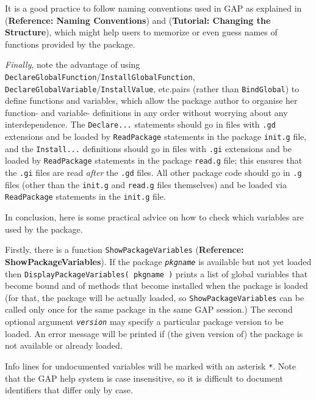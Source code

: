 \documentclass[a4paper,11pt]{report}
\begin{document}
{{ It is a good practice to follow naming conventions used in \textsf{GAP} as explained in  (\textbf{Reference: Naming Conventions}) and  (\textbf{Tutorial: Changing the Structure}), which might help users to memorize or even guess names of functions provided
by the package. 

 \emph{Finally}, note the advantage of using \texttt{DeclareGlobalFunction}/\texttt{InstallGlobalFunction}, \texttt{DeclareGlobalVariable}/\texttt{InstallValue}, etc.{\nobreakspace}pairs (rather than \texttt{BindGlobal}) to define functions and variables, which allow the package author to
organise her function- and variable- definitions in any order without worrying
about any interdependence. The \texttt{Declare...} statements should go in files with \texttt{.gd} extensions and be loaded by \texttt{ReadPackage} statements in the package \texttt{init.g} file, and the \texttt{Install...} definitions should go in files with \texttt{.gi} extensions and be loaded by \texttt{ReadPackage} statements in the package \texttt{read.g} file; this ensures that the \texttt{.gi} files are read \emph{after} the \texttt{.gd} files. All other package code should go in \texttt{.g} files (other than the \texttt{init.g} and \texttt{read.g} files themselves) and be loaded via \texttt{ReadPackage} statements in the \texttt{init.g} file. 

  In conclusion, here is some practical advice on how to check which variables
are used by the package. 

 Firstly, there is a function \texttt{ShowPackageVariables} (\textbf{Reference: ShowPackageVariables}). If the package \mbox{\texttt{\mdseries\slshape pkgname}} is available but not yet loaded then \texttt{DisplayPackageVariables( pkgname )} prints a list of global variables that become bound and of methods that become
installed when the package is loaded (for that, the package will be actually
loaded, so \texttt{ShowPackageVariables} can be called only once for the same package in the same \textsf{GAP} session.) The second optional argument \mbox{\texttt{\mdseries\slshape version}} may specify a particular package version to be loaded. An error message will
be printed if (the given version of) the package is not available or already
loaded. 

 Info lines for undocumented variables will be marked with an asterisk \texttt{*}. Note that the \textsf{GAP} help system is case insensitive, so it is difficult to document identifiers
that differ only by case. 

}}
\end{document}
